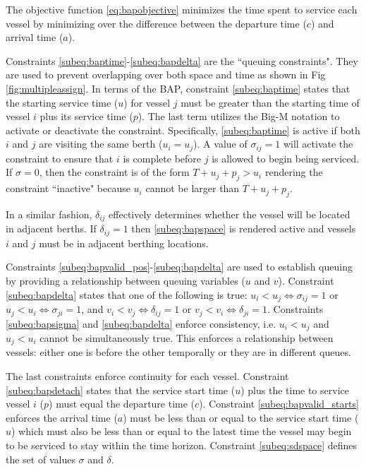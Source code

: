\documentclass[letterpaper, 10pt, conference]{IEEEtran}
\begin{document}
The objective function \eqref{eq:bapobjective} minimizes the time spent to service each vessel by minimizing over the difference between the departure time (\(c\)) and arrival time (\(a\)).

Constraints \ref{subeq:baptime}-\ref{subeq:bapdelta} are the ``queuing constraints". They are used to prevent overlapping over both space and time as shown in Fig \ref{fig:multipleassign}. In terms of the BAP, constraint \eqref{subeq:baptime} states that the starting service time (\(u\)) for vessel \(j\) must be greater than the starting time of vessel \(i\) plus its service time (\(p\)). The last term utilizes the Big-M notation to activate or deactivate the constraint. Specifically, \eqref{subeq:baptime} is active if both \(i\) and \(j\) are visiting the same berth (\(u_i = u_j\)). A value of \(\sigma_{ij} = 1\) will activate the constraint to ensure that \(i\) is complete before \(j\) is allowed to begin being serviced. If \(\sigma = 0\), then the constraint is of the form \(T + u_j + p_j > u_i\) rendering the constraint ``inactive" because \(u_i\) cannot be larger than \(T + u_j + p_j\).

In a similar fashion, \(\delta_{ij}\) effectively determines whether the vessel will be located in adjacent berths. If \(\delta_{ij} = 1\) then \eqref{subeq:bapspace} is rendered active and vessels \(i\) and \(j\) must be in adjacent berthing locations.

Constraints \ref{subeq:bapvalid_pos}-\ref{subeq:bapdelta} are used to establish queuing by providing a relationship between queuing variables (\(u\) and \(v\)). Constraint \eqref{subeq:bapdelta} states that one of the following is true: \(u_i < u_j \iff \sigma_{ij} = 1\) or \(u_j < u_i \iff \sigma_{ji} = 1\), and \(v_i < v_j \iff \delta_{ij} = 1\) or \(v_j < v_i \iff \delta_{ji} = 1\). Constraints \eqref{subeq:bapsigma} and \eqref{subeq:bapdelta} enforce consistency, i.e. \(u_i < u_j\) and \(u_j < u_i\) cannot be simultaneously true. This enforces a relationship between vessels: either one is before the other temporally or they are in different queues.

The last constraints enforce continuity for each vessel. Constraint \eqref{subeq:bapdetach} states that the service start time (\(u\)) plus the time to service vessel \(i\) (\(p\)) must equal the departure time (\(c\)). Constraint \eqref{subeq:bapvalid_starts} enforces the arrival time (\(a\)) must be less than or equal to the service start time (\(u\)) which must also be less than or equal to the latest time the vessel may begin to be serviced to stay within the time horizon. Constraint \eqref{subeq:sdspace} defines the set of values \(\sigma\) and \(\delta\).
\end{document}
